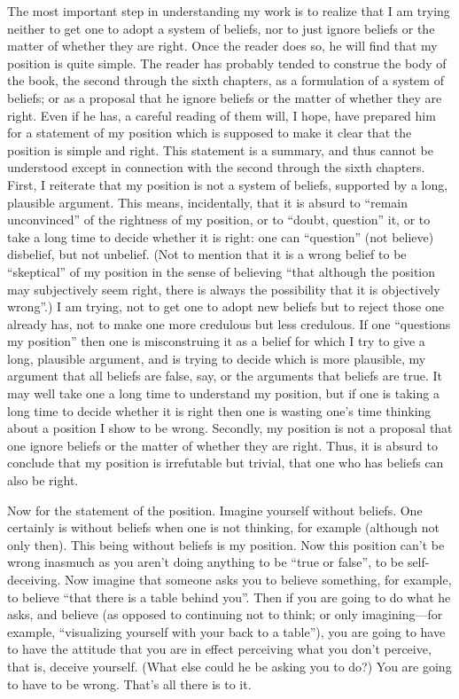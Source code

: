The most important step in understanding my work is to realize that I am trying neither to get one to adopt a system of beliefs, nor to just ignore beliefs or the matter of whether they are right. Once the reader does so, he will find that my position is quite simple. The reader has probably tended to construe the body of the book, the second through the sixth chapters, as a formulation of a system of beliefs; or as a proposal that he ignore beliefs or the matter of whether they are right. Even if he has, a careful reading of them will, I hope, have prepared him for a statement of my position which is supposed to make it clear that the position is simple and right. This statement is a summary, and thus cannot be understood except in connection with the second through the sixth chapters. First, I reiterate that my position is not a system of beliefs, supported by a long, plausible argument. This means, incidentally, that it is absurd to \enquote{remain unconvinced} of the rightness of my position, or to \enquote{doubt, question} it, or to take a long time to decide whether it is right: one can \enquote{question} (not believe) disbelief, but not unbelief. (Not to mention that it is a wrong belief to be \enquote{skeptical} of my position in the sense of believing \enquote{that although the position may subjectively seem right, there is always the possibility that it is objectively wrong}.) I am trying, not to get one to adopt new beliefs but to reject those one already has, not to make one more credulous but less credulous. If one \enquote{questions my position} then one is misconstruing it as a belief for which I try to give a long, plausible argument, and is trying to decide which is more plausible, my argument that all beliefs are false, say, or the arguments that beliefs are true. It may well take one a long time to understand my position, but if one is taking a long time to decide whether it is right then one is wasting one's time thinking about a position I show to be wrong. Secondly, my position is not a proposal that one ignore beliefs or the matter of whether they are right. Thus, it is absurd to conclude that my position is irrefutable but trivial, that one who has beliefs can also be right. 

Now for the statement of the position. Imagine yourself without beliefs. One certainly is without beliefs when one is not thinking, for example (although not only then). This being without beliefs is my position. Now this position can't be wrong inasmuch as you aren't doing anything to be \enquote{true or false}, to be self-deceiving. Now imagine that someone asks you to believe something, for example, to believe \enquote{that there is a table behind you}. Then if you are going to do what he asks, and believe (as opposed to continuing not to think; or only imagining---for example, \enquote{visualizing yourself with your back to a table}), you are going to have to have the attitude that you are in effect perceiving what you don't perceive, that is, deceive yourself. (What else could he be asking you to do?) You are going to have to be wrong. That's all there is to it. 

